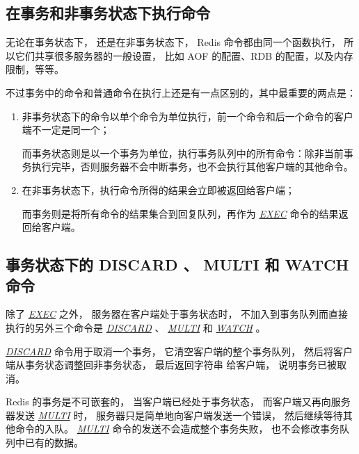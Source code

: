 \documentclass[a4paper,11pt,english]{sphinxmanual}
\begin{document}
\subsection{在事务和非事务状态下执行命令}
\label{feature/transaction:id6}
无论在事务状态下，
还是在非事务状态下，
Redis 命令都由同一个函数执行，
所以它们共享很多服务器的一般设置，
比如 AOF 的配置、RDB 的配置，以及内存限制，等等。

不过事务中的命令和普通命令在执行上还是有一点区别的，其中最重要的两点是：
\begin{enumerate}
\item {} 
非事务状态下的命令以单个命令为单位执行，前一个命令和后一个命令的客户端不一定是同一个；

而事务状态则是以一个事务为单位，执行事务队列中的所有命令：除非当前事务执行完毕，否则服务器不会中断事务，也不会执行其他客户端的其他命令。

\item {} 
在非事务状态下，执行命令所得的结果会立即被返回给客户端；

而事务则是将所有命令的结果集合到回复队列，再作为 \href{http://redis.readthedocs.org/en/latest/transaction/exec.html\#exec}{\emph{EXEC}} 命令的结果返回给客户端。

\end{enumerate}


\subsection{事务状态下的 DISCARD 、 MULTI 和 WATCH 命令}
\label{feature/transaction:discard-multi-watch}
除了 \href{http://redis.readthedocs.org/en/latest/transaction/exec.html\#exec}{\emph{EXEC}} 之外，
服务器在客户端处于事务状态时，
不加入到事务队列而直接执行的另外三个命令是 \href{http://redis.readthedocs.org/en/latest/transaction/discard.html\#discard}{\emph{DISCARD}} 、 \href{http://redis.readthedocs.org/en/latest/transaction/multi.html\#multi}{\emph{MULTI}} 和 \href{http://redis.readthedocs.org/en/latest/transaction/watch.html\#watch}{\emph{WATCH}} 。

\href{http://redis.readthedocs.org/en/latest/transaction/discard.html\#discard}{\emph{DISCARD}} 命令用于取消一个事务，
它清空客户端的整个事务队列，
然后将客户端从事务状态调整回非事务状态，
最后返回字符串  给客户端，
说明事务已被取消。

Redis 的事务是不可嵌套的，
当客户端已经处于事务状态，
而客户端又再向服务器发送 \href{http://redis.readthedocs.org/en/latest/transaction/multi.html\#multi}{\emph{MULTI}} 时，
服务器只是简单地向客户端发送一个错误，
然后继续等待其他命令的入队。
\href{http://redis.readthedocs.org/en/latest/transaction/multi.html\#multi}{\emph{MULTI}} 命令的发送不会造成整个事务失败，
也不会修改事务队列中已有的数据。
\end{document}
